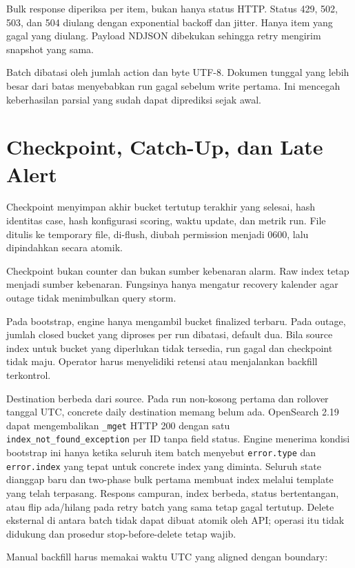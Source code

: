 \documentclass[11pt,a4paper,oneside]{report}
\DeclareRobustCommand{\code}[1]{\nolinkurl{#1}}
\begin{document}
Bulk response diperiksa per item, bukan hanya status HTTP. Status 429, 502, 503,
dan 504 diulang dengan exponential backoff dan jitter. Hanya item yang gagal yang
diulang. Payload NDJSON dibekukan sehingga retry mengirim snapshot yang sama.

Batch dibatasi oleh jumlah action dan byte UTF-8. Dokumen tunggal yang lebih besar
dari batas menyebabkan run gagal sebelum write pertama. Ini mencegah keberhasilan
parsial yang sudah dapat diprediksi sejak awal.

\chapter{Checkpoint, Catch-Up, dan Late Alert}

Checkpoint menyimpan akhir bucket tertutup terakhir yang selesai, hash identitas
case, hash konfigurasi scoring, waktu update, dan metrik run. File ditulis ke temporary
file, di-flush, diubah permission menjadi 0600, lalu dipindahkan secara atomik.

Checkpoint bukan counter dan bukan sumber kebenaran alarm. Raw index tetap menjadi
sumber kebenaran. Fungsinya hanya mengatur recovery kalender agar outage tidak
menimbulkan query storm.

Pada bootstrap, engine hanya mengambil bucket finalized terbaru. Pada outage, jumlah
closed bucket yang diproses per run dibatasi, default dua. Bila source index untuk
bucket yang diperlukan tidak tersedia, run gagal dan checkpoint tidak maju. Operator
harus menyelidiki retensi atau menjalankan backfill terkontrol.

Destination berbeda dari source. Pada run non-kosong pertama dan rollover tanggal
UTC, concrete daily destination memang belum ada. OpenSearch 2.19 dapat mengembalikan
\code{\_mget} HTTP 200 dengan satu \code{index\_not\_found\_exception} per ID tanpa
field status.\cite{osmget,osmgetsource} Engine menerima kondisi bootstrap ini hanya ketika seluruh item batch
menyebut \code{error.type} dan \code{error.index} yang tepat untuk concrete index
yang diminta. Seluruh state dianggap baru dan two-phase bulk pertama membuat index
melalui template yang telah terpasang. Respons campuran, index berbeda, status
bertentangan, atau flip ada/hilang pada retry batch yang sama tetap gagal tertutup.
Delete eksternal di antara batch tidak dapat dibuat atomik oleh API; operasi itu
tidak didukung dan prosedur stop-before-delete tetap wajib.

Manual backfill harus memakai waktu UTC yang aligned dengan boundary:
\end{document}
